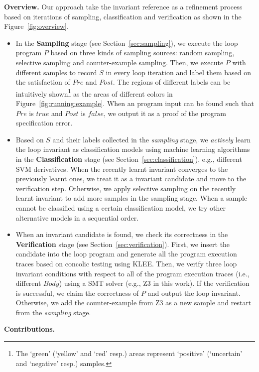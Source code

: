 \medskip\noindent
\textbf{Overview.}
Our approach take the invariant reference as a refinement process 
based on iterations of sampling, classification and verification 
as shown in the Figure~\ref{fig:overview}. 
\begin{itemize}
    \item 
    In the \textbf{Sampling} stage (see Section~\ref{sec:sampling}), 
    we execute the loop program $P$ based on three kinds of sampling sources: 
    random sampling, selective sampling and counter-example sampling. 
    Then, we execute $P$ with different samples to record $S$ in every loop iteration 
    and label them based on the satisfaction of $\mathit{Pre}$ and $\mathit{Post}$. 
    The regions of different labels can be intuitively shown\footnote{
        The `green' (`yellow' and `red' resp.) areas 
        represent `positive' (`uncertain' and `negative' resp.) samples. 
    } as the areas of different colors in Figure~\ref{fig:running:example}. 
    When an program input can be found such that 
    $\mathit{Pre}$ is $\mathit{true}$ and $\mathit{Post}$ is $\mathit{false}$, 
    we output it as a proof of the program specification error. 
    \item 
    Based on $S$ and their labels collected in the \emph{sampling} stage, 
    we \emph{actively} learn the loop invariant as classification models 
    using machine learning algorithms 
    in the \textbf{Classification} stage (see Section~\ref{sec:classification}), 
    e.g., different SVM derivatives. 
    When the recently learnt invariant converges to the previously learnt ones, 
    we treat it as a invariant candidate and move to the verification step. 
    Otherwise, we apply selective sampling on the recently learnt invariant 
    to add more samples in the sampling stage. 
    When a sample cannot be classified using a certain classification model, 
    we try other alternative models in a sequential order. 
    \item 
    When an invariant candidate is found, 
    we check its correctness in the \textbf{Verification} stage (see Section~\ref{sec:verification}). 
    First, we insert the candidate into the loop program and generate all the program execution traces 
    based on concolic testing using KLEE. 
    Then, we verify three loop invariant conditions 
    with respect to all of the program execution traces (i.e., different $\mathit{Body}$) 
    using a SMT solver (e.g., Z3 in this work). 
    If the verification is successful, we claim the correctness of $P$ and output the loop invariant. 
    Otherwise, we add the counter-example from Z3 as a new sample 
    and restart from the \emph{sampling} stage. 
\end{itemize}

\medskip\noindent
\textbf{Contributions.}


